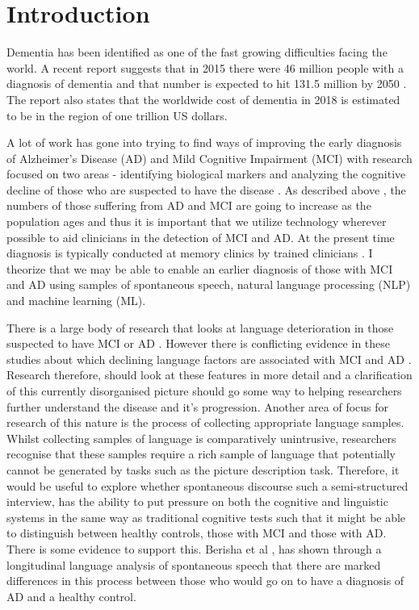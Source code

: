 \section{Introduction}
Dementia has been identified as one of the fast growing difficulties facing the world. A recent report suggests that in 2015 there were 46 million people with a diagnosis of dementia and that number is expected to hit 131.5 million by 2050 \cite{Prince2015}. The report also states that the worldwide cost of dementia in 2018 is estimated to be in the region of one trillion US dollars.
\par
A lot of work has gone into trying to find ways of improving the early diagnosis of Alzheimer's Disease (AD) and Mild Cognitive Impairment (MCI) with research focused on two areas - identifying biological markers and analyzing the cognitive decline of those who are suspected to have the disease \cite{Taler2008}. As described above \cite{Prince2015}, the numbers of those suffering from AD and MCI are going to increase as the population ages and thus it is important that we utilize technology wherever possible to aid clinicians in the detection of MCI and AD. At the present time diagnosis is typically conducted at memory clinics by trained clinicians \cite{Boschi2017}. I theorize that we may be able to enable an earlier diagnosis of those with MCI and AD using samples of spontaneous speech, natural language processing (NLP) and machine learning (ML).
\par
There is a large body of research that looks at language deterioration in those suspected to have MCI or AD \cite{Taler2008, Boschi2017}. However there is conflicting evidence in these studies about which declining language factors are associated with MCI and AD \cite{Taler2008, Boschi2017}. Research therefore, should look at these features in more detail and a clarification of this currently disorganised picture should go some way to helping researchers further understand the disease and it's progression. Another area of focus for research of this nature is the process of collecting appropriate language samples. Whilst collecting samples of language is comparatively unintrusive, researchers recognise that these samples require a rich sample of language that potentially cannot be generated by tasks such as the picture description task. Therefore, it would be useful to explore whether spontaneous discourse such a semi-structured interview, has the ability to put pressure on both the cognitive and linguistic systems in the same way as traditional cognitive tests such that it might be able to distinguish between healthy controls, those with MCI and those with AD. There is some evidence to support this. Berisha et al \cite{Berisha2015}, has shown through a longitudinal language analysis of spontaneous speech that there are marked differences in this process between those who would go on to have a diagnosis of AD and a healthy control. 
